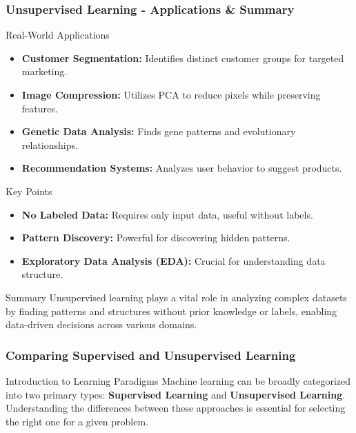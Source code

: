 \documentclass[aspectratio=169]{beamer}
\begin{document}
\begin{frame}[fragile]
  \frametitle{Unsupervised Learning - Applications & Summary}
  \begin{block}{Real-World Applications}
    \begin{itemize}
      \item \textbf{Customer Segmentation:} Identifies distinct customer groups for targeted marketing.
      \item \textbf{Image Compression:} Utilizes PCA to reduce pixels while preserving features.
      \item \textbf{Genetic Data Analysis:} Finds gene patterns and evolutionary relationships.
      \item \textbf{Recommendation Systems:} Analyzes user behavior to suggest products.
    \end{itemize}
  \end{block}
  
  \begin{block}{Key Points}
    \begin{itemize}
      \item \textbf{No Labeled Data:} Requires only input data, useful without labels.
      \item \textbf{Pattern Discovery:} Powerful for discovering hidden patterns.
      \item \textbf{Exploratory Data Analysis (EDA):} Crucial for understanding data structure.
    \end{itemize}
  \end{block}
  
  \begin{block}{Summary}
    Unsupervised learning plays a vital role in analyzing complex datasets by finding patterns and structures without prior knowledge or labels, enabling data-driven decisions across various domains.
  \end{block}
\end{frame}

\begin{frame}[fragile]
    \frametitle{Comparing Supervised and Unsupervised Learning}
    \begin{block}{Introduction to Learning Paradigms}
        Machine learning can be broadly categorized into two primary types: \textbf{Supervised Learning} and \textbf{Unsupervised Learning}. Understanding the differences between these approaches is essential for selecting the right one for a given problem.
    \end{block}
\end{frame}
\end{document}
